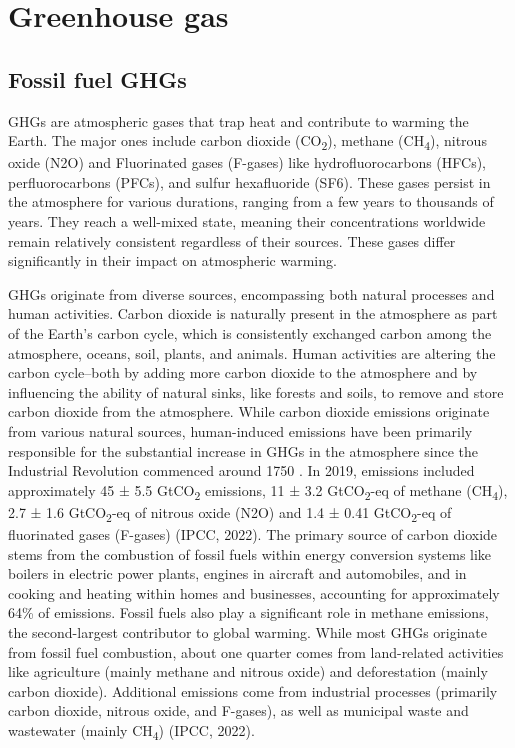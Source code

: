 \section{Greenhouse gas}
\subsection{Fossil fuel GHGs}

GHGs are atmospheric gases that trap heat and contribute to warming the Earth. The major ones include carbon dioxide (CO\textsubscript{2}), methane (CH\textsubscript{4}), nitrous oxide (N2O) and Fluorinated gases (F-gases) like hydrofluorocarbons (HFCs), perfluorocarbons (PFCs), and sulfur hexafluoride (SF6). These gases persist in the atmosphere for various durations, ranging from a few years to thousands of years. They reach a well-mixed state, meaning their concentrations worldwide remain relatively consistent regardless of their sources. 
These gases differ significantly in their impact on atmospheric warming. \par
GHGs originate from diverse sources, encompassing both natural processes and human activities. Carbon dioxide is naturally present in the atmosphere as part of the Earth's carbon cycle, which is consistently exchanged carbon among the atmosphere, oceans, soil, plants, and animals. Human activities are altering the carbon cycle–both by adding more carbon dioxide to the atmosphere and by influencing the ability of natural sinks, like forests and soils, to remove and store carbon dioxide from the atmosphere. While carbon dioxide emissions originate from various natural sources, human-induced emissions have been primarily responsible for the substantial increase in GHGs in the atmosphere since the Industrial Revolution commenced around 1750 \citep{RN3}. In 2019, emissions included approximately 45 ± 5.5 GtCO\textsubscript{2} emissions, 11 ± 3.2 GtCO\textsubscript{2}-eq of methane (CH\textsubscript{4}), 2.7 ± 1.6 GtCO\textsubscript{2}-eq of nitrous oxide (N2O) and 1.4 ± 0.41 GtCO\textsubscript{2}-eq of fluorinated gases (F-gases) (IPCC, 2022). The primary source of carbon dioxide stems from the combustion of fossil fuels within energy conversion systems like boilers in electric power plants, engines in aircraft and automobiles, and in cooking and heating within homes and businesses, accounting for approximately 64\% of emissions. Fossil fuels also play a significant role in methane emissions, the second-largest contributor to global warming. While most GHGs originate from fossil fuel combustion, about one quarter comes from land-related activities like agriculture (mainly methane and nitrous oxide) and deforestation (mainly carbon dioxide). Additional emissions come from industrial processes (primarily carbon dioxide, nitrous oxide, and F-gases), as well as municipal waste and wastewater (mainly CH\textsubscript{4}) (IPCC, 2022). 
